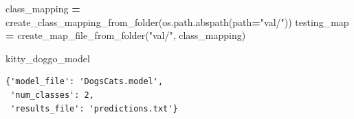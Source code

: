 \documentclass[]{book}
\newenvironment{Shaded}{\begin{snugshade}}{\end{snugshade}}
\newcommand{\SpecialCharTok}[1]{\textcolor[rgb]{0.00,0.00,0.00}{#1}}
\newcommand{\StringTok}[1]{\textcolor[rgb]{0.31,0.60,0.02}{#1}}
\newcommand{\OperatorTok}[1]{\textcolor[rgb]{0.81,0.36,0.00}{\textbf{#1}}}
\newcommand{\BuiltInTok}[1]{#1}
\newcommand{\NormalTok}[1]{#1}
\theoremstyle{definition}
\theoremstyle{definition}
\theoremstyle{definition}
\theoremstyle{remark}
\begin{document}
\begin{Shaded}
\begin{Highlighting}[]
\NormalTok{class_mapping }\OperatorTok{=}\NormalTok{ create_class_mapping_from_folder(os.path.abspath(path}\OperatorTok{=}\StringTok{"val/"}\NormalTok{))}
\NormalTok{testing_map }\OperatorTok{=}\NormalTok{ create_map_file_from_folder(}\StringTok{"val/"}\NormalTok{, class_mapping)}
\end{Highlighting}
\end{Shaded}

\begin{Shaded}
\begin{Highlighting}[]
\NormalTok{kitty_doggo_model}
\end{Highlighting}
\end{Shaded}

\begin{verbatim}
{'model_file': 'DogsCats.model',
 'num_classes': 2,
 'results_file': 'predictions.txt'}
\end{verbatim}

\begin{Shaded}
\end{Shaded}
\end{document}

